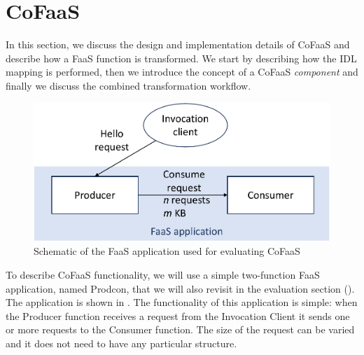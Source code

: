 \section{CoFaaS}


In this section, we discuss the design and implementation details of CoFaaS and describe how a FaaS function is transformed. We start by describing how the IDL mapping is performed, then we introduce the concept of a CoFaaS \emph{component} and finally we discuss the combined transformation workflow.

\begin{figure}
  \centering
  \includegraphics[width=\columnwidth]{figures/experimental_setup}
  \caption{\label{es:fig:func-setup} Schematic of the FaaS application used for evaluating CoFaaS}
\end{figure}

To describe CoFaaS functionality, we will use a simple two-function FaaS application, named Prodcon, that we will also revisit in the evaluation section (). The application is shown in . The functionality of this application is simple: when the Producer function receives a request from the Invocation Client it sends one or more requests to the Consumer function. The size of the request can be varied and it does not need to have any particular structure.

